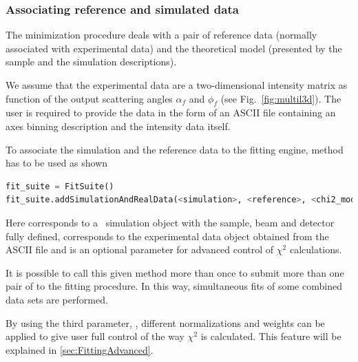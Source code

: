 \subsubsection{Associating reference and simulated data}

The minimization procedure deals with a pair of reference data (normally
associated with experimental data) and the theoretical model (presented by the sample and the simulation descriptions).

We assume that the experimental data are a two-dimensional intensity
matrix as function of the output scattering
angles $\alpha_f$ and $\phi_f$ (see Fig.~\ref{fig:multil3d}).
The user is required to provide the data in the form of an ASCII file
containing an axes
binning description and the intensity data itself.
\vspace*{2mm}

\vspace*{1mm}

To associate the simulation and the reference data to the fitting engine, method \newline
{} has to be used as shown
\begin{lstlisting}[language=python, style=eclipseboxed,numbers=none]
fit_suite = FitSuite()
fit_suite.addSimulationAndRealData(<simulation>, <reference>, <chi2_module>)
\end{lstlisting}

Here  corresponds to a \BornAgain\ simulation object
with the  sample, beam and detector fully defined, 
corresponds to the experimental data object obtained from the ASCII file and  is an optional parameter for advanced
control of $\chi^2$ calculations.

It is possible to call this given method more than once to submit more than one pair of
 to the fitting procedure.
In this way, simultaneous fits of
some combined data sets are performed.

By using the third parameter, , different normalizations and weights
can be applied to give user full control of the way $\chi^2$ is calculated.
This feature will be explained in \cref{sec:FittingAdvanced}.



